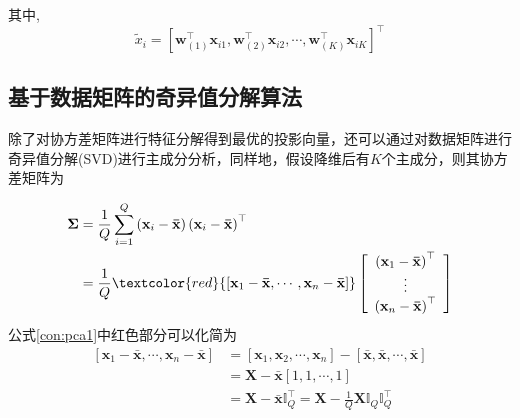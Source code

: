 \documentclass[lang=cn,10pt]{gorgeousnbook}
\numberwithin{equation}{section}%
\numberwithin{figure}{section}%
\begin{document}
其中,
\begin{equation}
\tilde{x}_i=\left[ \mathbf{w}_{\left( 1 \right)}^{\top}\mathbf{x}_{i1},\mathbf{w}_{\left( 2 \right)}^{\top}\mathbf{x}_{i2},\cdots ,\mathbf{w}_{\left( K \right)}^{\top}\mathbf{x}_{iK} \right]^{\top} 
\end{equation}

\subsection{基于数据矩阵的奇异值分解算法}
除了对协方差矩阵进行特征分解得到最优的投影向量，还可以通过对数据矩阵进行奇异值分解(SVD)进行主成分分析，同样地，假设降维后有$K$个主成分，则其协方差矩阵为

\begin{equation}
\begin{aligned}
\mathbf{\Sigma}&=\frac{1}{Q}\sum_{i=1}^Q{\left( \mathbf{x}_i-\mathbf{\bar{x}} \right)}\left( \mathbf{x}_i-\mathbf{\bar{x}} \right) ^{\top} \\
&=\frac{1}{Q}\textcolor{red}{\left[ \mathbf{x}_1-\mathbf{\bar{x},}\cdots ,\mathbf{x}_n-\mathbf{\bar{x}} \right]} \left[ \begin{array}{c}
	\left( \mathbf{x}_1-\mathbf{\bar{x}} \right) ^{\top}\\
	\vdots\\
	\left( \mathbf{x}_n-\mathbf{\bar{x}} \right) ^{\top}\\
\end{array} \right] \label{con:pca1}
\end{aligned}
\end{equation}
公式\eqref{con:pca1}中红色部分可以化简为
\begin{equation}
\begin{aligned}
\left[ \mathbf{x}_1-\mathbf{\bar{x},}\cdots ,\mathbf{x}_n-\mathbf{\bar{x}} \right]&=\left[ \mathbf{x}_1,\mathbf{x}_2,\cdots ,\mathbf{x}_n \right] -\left[ \mathbf{\bar{x},\bar{x},}\cdots ,\mathbf{\bar{x}} \right] \\
&=\mathbf{X}-\mathbf{\bar{x}}\left[ 1,1,\cdots ,1 \right] \\
&=\mathbf{X}-\mathbf{\bar{x}}\mathbb{I}_{Q}^{\top}=\mathbf{X}-\frac{1}{Q}\mathbf{X}\mathbb{I}_Q\mathbb{I}_{Q}^{\top} \\
\end{aligned}
\end{equation}
\end{document}

